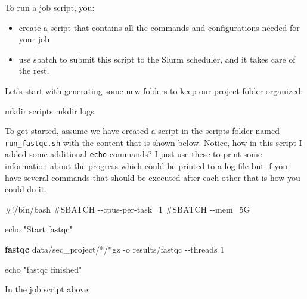 \documentclass[
  letterpaper,
  DIV=11,
  numbers=noendperiod]{scrreprt}
\newenvironment{Shaded}{}{}
\newcommand{\AttributeTok}[1]{\textcolor[rgb]{0.84,0.23,0.29}{#1}}
\newcommand{\BuiltInTok}[1]{\textcolor[rgb]{0.84,0.23,0.29}{#1}}
\newcommand{\CommentTok}[1]{\textcolor[rgb]{0.42,0.45,0.49}{#1}}
\newcommand{\ExtensionTok}[1]{\textcolor[rgb]{0.84,0.23,0.29}{\textbf{#1}}}
\newcommand{\FunctionTok}[1]{\textcolor[rgb]{0.44,0.26,0.76}{#1}}
\newcommand{\NormalTok}[1]{\textcolor[rgb]{0.14,0.16,0.18}{#1}}
\newcommand{\PreprocessorTok}[1]{\textcolor[rgb]{0.84,0.23,0.29}{#1}}
\newcommand{\StringTok}[1]{\textcolor[rgb]{0.01,0.18,0.38}{#1}}
\providecommand{\tightlist}{%
  \setlength{\itemsep}{0pt}\setlength{\parskip}{0pt}}\usepackage{longtable,booktabs,array}
\begin{document}
To run a job script, you:

\begin{itemize}
\tightlist
\item
  create a script that contains all the commands and configurations
  needed for your job
\item
  use sbatch to submit this script to the Slurm scheduler, and it takes
  care of the rest.
\end{itemize}

Let's start with generating some new folders to keep our project folder
organized:

\begin{Shaded}
\begin{Highlighting}[]
\FunctionTok{mkdir}\NormalTok{ scripts }
\FunctionTok{mkdir}\NormalTok{ logs}
\end{Highlighting}
\end{Shaded}

To get started, assume we have created a script in the scripts folder
named \texttt{run\_fastqc.sh} with the content that is shown below.
Notice, how in this script I added some additional \texttt{echo}
commands? I just use these to print some information about the progress
which could be printed to a log file but if you have several commands
that should be executed after each other that is how you could do it.

\begin{Shaded}
\begin{Highlighting}[]
\CommentTok{\#!/bin/bash}
\CommentTok{\#SBATCH {-}{-}cpus{-}per{-}task=1}
\CommentTok{\#SBATCH {-}{-}mem=5G}

\BuiltInTok{echo} \StringTok{"Start fastqc"}

\ExtensionTok{fastqc}\NormalTok{ data/seq\_project/}\PreprocessorTok{*}\NormalTok{/}\PreprocessorTok{*}\NormalTok{gz }\AttributeTok{{-}o}\NormalTok{ results/fastqc  }\AttributeTok{{-}{-}threads}\NormalTok{ 1}

\BuiltInTok{echo} \StringTok{"fastqc finished"}
\end{Highlighting}
\end{Shaded}

In the job script above:
\end{document}
